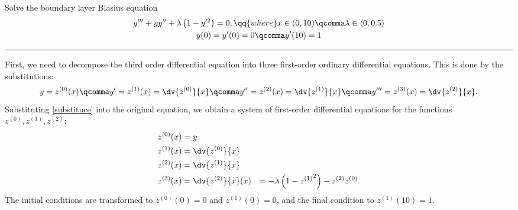 \fontsize{10pt}{15pt}\selectfont
\setcounter{example}{27}
\begin{example}
	Solve the boundary layer Blasius equation
	\begin{gather*}
		y''' + y y'' + \lambda \left( 1 - y'^{2} \right)  = 0,
		\qq{where } x \in (0,10) \qcomma \lambda \in \langle 0, 0.5 \rangle \\
		y(0) = y'(0) = 0 \qcomma y'(10) = 1
	\end{gather*}
	\smallskip
	\hrule
	\medskip
	First, we need to decompose the third order differential equation into three first-order ordinary differential equations. This is done by the substitutions:
	\begin{equation}
		\label{substituce}
		y = z^{(0)}(x) \qcomma
		y' = z^{(1)}(x) = \dv{z^{(0)}}{x} \qcomma
		y'' = z^{(2)}(x) = \dv{z^{(1)}}{x} \qcomma
		y''' = z^{(3)}(x) = \dv{z^{(2)}}{x}.
	\end{equation}
	Substituting \ref{substituce} into the original equation, we obtain a system of first-order differential equations for the functions $z^{(0)}, z^{(1)}, z^{(2)}$:
	\begin{equation}
		\begin{aligned}
			z^{(0)}(x) & = y                                                            \\
			z^{(1)}(x) & = \dv{z^{(0)}}{x}                                              \\
			z^{(2)}(x) & = \dv{z^{(1)}}{x}                                              \\
			z^{(3)}(x) & = \dv{z^{(2)}}{x}(x) & = -\lambda \left( 1 - {z^{(1)}}^{2} \right)  - z^{(2)}z^{(0)}.
		\end{aligned}
	\end{equation}
	The initial conditions are transformed to $z^{(0)}(0) = 0$ and $z^{(1)}(0) = 0$, and the final condition to $z^{(1)}(10) = 1$.

	\medskip


\end{example}
